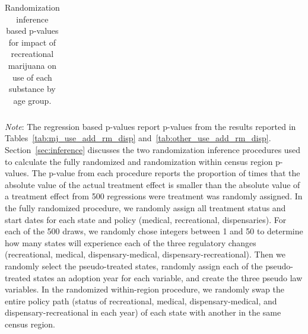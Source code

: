 \documentclass[12pt]{article}%
\begin{document}
\begin{table}[ht]\centering
	\begin{adjustbox}{width=.9\textwidth}
		\centering
		 \caption{Randomization inference based p-values for impact of recreational marijuana on use of each substance by age group.}
		   \label{fig:randomization_table}
		\centering
		\begin{tabular}{llccc}
			\toprule
			
			\bottomrule 
		\end{tabular}
		\label{tab:ri_p_values}
	\end{adjustbox}
	{\footnotesize
	\begin{justify}
	    \emph{Note}:
		The regression based p-values report p-values from the results reported in Tables~\ref{tab:mj_use_add_rm_disp} and~\ref{tab:other_use_add_rm_disp}.
		Section~\ref{sec:inference} discusses the two randomization inference procedures used to calculate the fully randomized and randomization within census region p-values.
		The p-value from each procedure reports the proportion of times that the absolute value of the actual treatment effect is smaller than the absolute value of a treatment effect from 500 regressions were treatment was randomly assigned.
		In the fully randomized procedure, we randomly assign all treatment status and start dates for each state and policy (medical, recreational, dispensaries).
		For each of the 500 draws, we randomly chose integers between 1 and 50 to determine how many states will experience each of the three regulatory changes (recreational, medical, dispensary-medical, dispensary-recreational).
		Then we randomly select the pseudo-treated states, randomly assign each of the pseudo-treated states an adoption year for each variable, and create the three pseudo law variables.
		In the randomized within-region procedure, we randomly swap the entire policy path (status of recreational, medical, dispensary-medical, and dispensary-recreational in each year) of each state with another in the same census region.
	\end{justify}
	}
\end{table}
\end{document}
